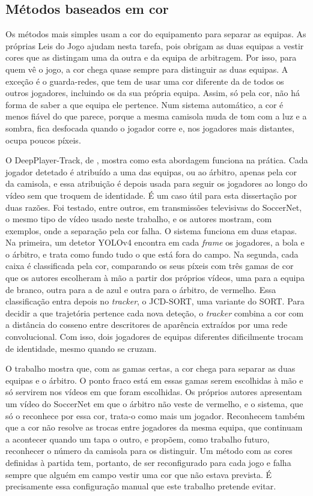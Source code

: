 \subsection{Métodos baseados em cor}

Os métodos mais simples usam a cor do equipamento para separar as equipas. As próprias Leis do Jogo ajudam nesta tarefa, pois obrigam as duas equipas a vestir cores que as distingam uma da outra e da equipa de arbitragem. Por isso, para quem vê o jogo, a cor chega quase sempre para distinguir as duas equipas. A exceção é o guarda-redes, que tem de usar uma cor diferente da de todos os outros jogadores, incluindo os da sua própria equipa. Assim, só pela cor, não há forma de saber a que equipa ele pertence. Num sistema automático, a cor é menos fiável do que parece, porque a mesma camisola muda de tom com a luz e a sombra, fica desfocada quando o jogador corre e, nos jogadores mais distantes, ocupa poucos píxeis.

O DeepPlayer-Track, de \citet{naik2022deepplayer}, mostra como esta abordagem funciona na prática. Cada jogador detetado é atribuído a uma das equipas, ou ao árbitro, apenas pela cor da camisola, e essa atribuição é depois usada para seguir os jogadores ao longo do vídeo sem que troquem de identidade. É um caso útil para esta dissertação por duas razões. Foi testado, entre outros, em transmissões televisivas do SoccerNet, o mesmo tipo de vídeo usado neste trabalho, e os autores mostram, com exemplos, onde a separação pela cor falha. O sistema funciona em duas etapas. Na primeira, um detetor YOLOv4 encontra em cada \emph{frame} os jogadores, a bola e o árbitro, e trata como fundo tudo o que está fora do campo. Na segunda, cada caixa é classificada pela cor, comparando os seus píxeis com três gamas de cor que os autores escolheram à mão a partir dos próprios vídeos, uma para a equipa de branco, outra para a de azul e outra para o árbitro, de vermelho. Essa classificação entra depois no \emph{tracker}, o JCD-SORT, uma variante do SORT. Para decidir a que trajetória pertence cada nova deteção, o \emph{tracker} combina a cor com a distância do cosseno entre descritores de aparência extraídos por uma rede convolucional. Com isso, dois jogadores de equipas diferentes dificilmente trocam de identidade, mesmo quando se cruzam.

O trabalho mostra que, com as gamas certas, a cor chega para separar as duas equipas e o árbitro. O ponto fraco está em essas gamas serem escolhidas à mão e só servirem nos vídeos em que foram escolhidas. Os próprios autores apresentam um vídeo do SoccerNet em que o árbitro não veste de vermelho, e o sistema, que só o reconhece por essa cor, trata-o como mais um jogador. Reconhecem também que a cor não resolve as trocas entre jogadores da mesma equipa, que continuam a acontecer quando um tapa o outro, e propõem, como trabalho futuro, reconhecer o número da camisola para os distinguir. Um método com as cores definidas à partida tem, portanto, de ser reconfigurado para cada jogo e falha sempre que alguém em campo vestir uma cor que não estava prevista. É precisamente essa configuração manual que este trabalho pretende evitar.

